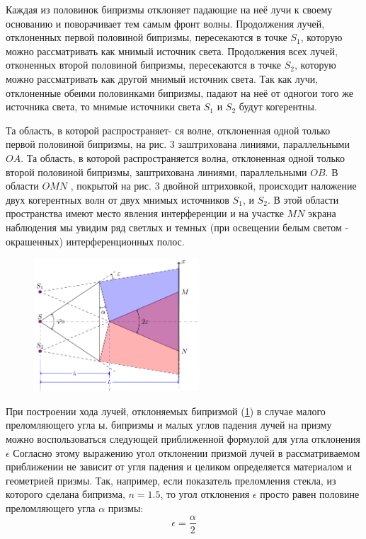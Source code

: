 Каждая из половинок бипризмы отклоняет падающие на неё лучи к своему основанию и поворачивает тем самым фронт волны.  Продолжения лучей, отклоненных первой половиной бипризмы, пересекаются в точке $S_1$, которую можно рассматривать как мнимый источник света. Продолжения всех лучей, отконенных второй половиной бипризмы, пересекаются в точке $S_2$, которую можно рассматривать как другой мнимый источник света. Так как лучи, отклоненные обеими половинками бипризмы, падают на неё от одногои того же источника света, то мнимые источники света $S_1$ и $S_2$ будут когерентны. 

Та область, в которой распространяет- ся волне, отклоненная одной только первой половиной бипризмы, на рис. 3 заштрихована линиями, параллельными $OA$. Та область, в которой распространяется волна, отклоненная одной только второй половиной бипризмы, заштрихована линиями, параллельными $OB$. В области $OMN$ , покрытой на рис. 3 двойной
штриховкой, происходит наложение двух когерентных волн от двух мнимых источников $S_1$, и $S_2$. В этой области пространства имеют место явления интерференции и на участке $MN$ экрана
наблюдения мы увидим ряд светлых и темных (при освещении белым светом - окрашенных) интерференционных полос.

\begin{figure}[H]
	\centering
	\includegraphics[width=0.55\textwidth]{ris/ris3}
	\caption{ }
	\label{fig:ris3}
\end{figure}

При построении хода лучей, отклоняемых бипризмой (\ref{fig:ris3}) в случае малого преломляющего угла ы. бипризмы и малых углов падения лучей на призму можно воспользоваться следующей приближенной формулой для угла отклонения $\epsilon$
Согласно этому выражению угол отклонении призмой лучей в рассматриваемом приближении не зависит от угля падения и целиком определяется материалом и геометрией призмы. Так, например, если показатель преломления стекла, из которого сделана бипризма, $n=1.5$, то угол отклонения $\epsilon$ просто равен половине преломляющего угла $\alpha$ призмы:
\begin{equation}
 	\epsilon=\frac{\alpha}{2}
 \end{equation} 

